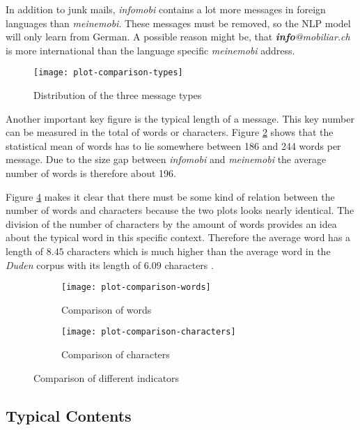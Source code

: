 In addition to junk mails, \emph{infomobi} contains a lot more messages in foreign languages than \emph{meinemobi}. These messages
must be removed, so the NLP model will only learn from German. A possible reason might be, that \emph{\textbf{info}@mobiliar.ch}
is more international than the language specific \emph{meinemobi} address.

\begin{figure}[!ht]
    \centering
    \texttt{[image: plot-comparison-types]}
    \caption{Distribution of the three message types}
    \label{fig:plot-comparison-types}
\end{figure}

Another important key figure is the typical length of a message. This key number can be measured in the total of words or characters.
Figure \ref{fig:plot-comparison-words} shows that the statistical mean of words has to lie somewhere between 186 and 244 words per
message. Due to the size gap between \emph{infomobi} and \emph{meinemobi} the average number of words is therefore about 196.

Figure \ref{fig:plot-comparison-characters} makes it clear that there must be some kind of relation between the number of words
and characters because the two plots looks nearly identical. The division of the number of characters by the amount of words provides
an idea about the typical word in this specific context. Therefore the average word has a length of $8.45$ characters which is much 
higher than the average word in the \emph{\Gls{Duden}} corpus with its length of $6.09$ characters \cite{duden}.

\begin{figure}[!ht]
    \begin{subfigure}{0.5\textwidth}
        \texttt{[image: plot-comparison-words]} 
        \caption{Comparison of words}
        \label{fig:plot-comparison-words}
    \end{subfigure}
    \begin{subfigure}{0.5\textwidth}
        \texttt{[image: plot-comparison-characters]}
        \caption{Comparison of characters}
        \label{fig:plot-comparison-characters}
    \end{subfigure}
    \caption{Comparison of different indicators}
\end{figure}

\subsection{Typical Contents}

